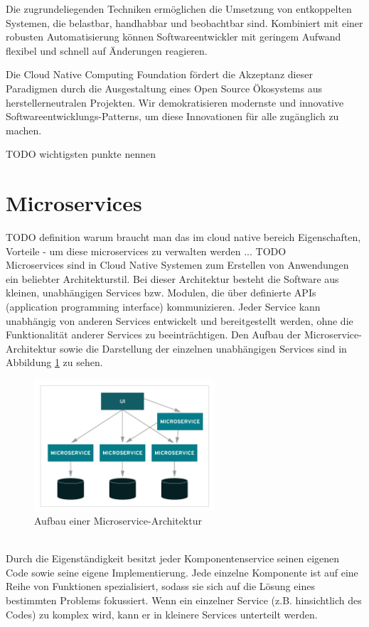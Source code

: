 Die zugrundeliegenden Techniken ermöglichen die Umsetzung von entkoppelten Systemen, die belastbar, handhabbar und beobachtbar sind. Kombiniert mit einer robusten Automatisierung können Softwareentwickler mit geringem Aufwand flexibel und schnell auf Änderungen reagieren.

Die Cloud Native Computing Foundation fördert die Akzeptanz dieser Paradigmen durch die Ausgestaltung eines Open Source Ökosystems aus herstellerneutralen Projekten. Wir demokratisieren modernste und innovative Softwareentwicklungs-Patterns, um diese Innovationen für alle zugänglich zu machen.

TODO wichtigsten punkte nennen


\section{Microservices}
TODO definition
warum braucht man das im cloud native bereich
Eigenschaften, Vorteile
- um diese microservices zu verwalten werden ... TODO\\
Microservices sind in Cloud Native Systemen zum Erstellen von Anwendungen ein beliebter Architekturstil. Bei dieser Architektur besteht die Software aus kleinen, unabhängigen Services bzw. Modulen, die über definierte APIs (application programming interface) kommunizieren. Jeder Service kann unabhängig von anderen Services entwickelt und bereitgestellt werden, ohne die Funktionalität anderer Services zu beeinträchtigen. Den Aufbau der Microservice-Architektur sowie die Darstellung der einzelnen unabhängigen Services sind in Abbildung \ref{micro} zu sehen.\\
\begin{figure}[bth] 
	\centering
	\includegraphics[width=0.6\textwidth]{Graphics/Microservice.png}
	\caption{Aufbau einer Microservice-Architektur}
	\label{micro}
\end{figure}\\
Durch die Eigenständigkeit besitzt jeder Komponentenservice seinen eigenen Code sowie seine eigene Implementierung. Jede einzelne Komponente ist auf eine Reihe von Funktionen spezialisiert, sodass sie sich auf die Lösung eines bestimmten Problems fokussiert. Wenn ein einzelner Service (z.B. hinsichtlich des Codes) zu komplex wird, kann er in kleinere Services unterteilt werden.\\
